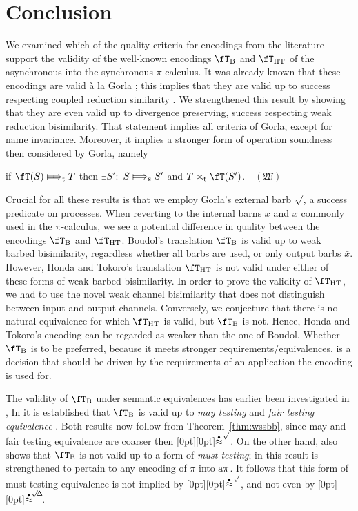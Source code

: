 \documentclass[runningheads]{llncs}
\newcommand{\thm}[1]{Theorem~\ref{thm:#1}}
\newcommand{\pT}{T}                      %
\newcommand{\fTHT}{\fT_{\textrm{HT}}}       %
\newcommand{\plat}[1]{\raisebox{0pt}[0pt][0pt]{#1}}     %
\newcommand{\trans}[1]{\fT(#1)}
\newcommand{\wbb}{\stackrel{\raisebox{-1pt}[0pt][0pt]{$\scriptscriptstyle \bullet$}}{\approx}}
\newcommand{\wssbb}{\wbb^\surd}
\newcommand{\wssbbd}{\wbb^{\!\surd\!\Delta}\!}
\newcommand{\pims}{\pi}
\newcommand{\pima}{{\rm a\pi}}
\begin{document}
\section{Conclusion}\label{sec:conclusion}

We examined which of the quality criteria for encodings from the literature support the validity
of the well-known encodings $\fT_{\rm B}$ and $\fTHT$ of the asynchronous into the synchronous $\pi$-calculus.
It was already known \cite{vG18a} that these encodings are valid \`a la Gorla \cite{Gorla10a}; this implies that
they are valid up to success respecting coupled reduction similarity \cite{EPTCS190.4}.
We strengthened this result by showing that they are even valid up to divergence preserving,
success respecting weak reduction bisimilarity. That statement implies all criteria of Gorla, except for name invariance.
Moreover, it implies a stronger form of operation soundness then considered by Gorla, namely
\begin{center}
\mbox{}\hfill
if $\trans{S} \Longmapsto_{\rm t} \pT$ then $\exists S'\!:$ $S\Longmapsto_{\rm s} S'$ and $\pT\asymp_{\rm t} \trans{S'}$.\hfill~~$(\mathfrak{W})$
\end{center}
Crucial for all these results is that we employ Gorla's external barb $\surd$, a success predicate
on processes. When reverting to the internal barns $x$ and $\bar x$ commonly used in the
$\pi$-calculus, we see a potential difference in quality between the encodings $\fT_{\rm B}$ and $\fTHT$.
Boudol's translation $\fT_{\rm B}$ is valid up to weak barbed bisimilarity, regardless whether all
barbs are used, or only output barbs $\bar x$. However, Honda and Tokoro's translation $\fTHT$
is not valid under either of these forms of weak barbed bisimilarity.
In order to prove the validity of $\fTHT$, we
had to use the novel weak channel bisimilarity that does not distinguish between input and output channels.
Conversely, we conjecture that there is no natural equivalence for which $\fTHT$ is valid, but $\fT_{\rm B}$ is not.
Hence, Honda and Tokoro's encoding can be regarded as weaker than the one of Boudol.
Whether $\fT_{\rm B}$ is to be preferred, because it meets stronger
requirements/equivalences, is a decision that should be driven by
the requirements of an application the encoding is used for.

The validity of $\fT_{\rm B}$ under semantic equivalences has earlier been investigated in \cite{CC01,CCP07},
In \cite{CC01} it is established that $\fT_{\rm B}$ is valid up to \emph{may testing}
\cite{DH84} and \emph{fair testing equivalence} \cite{BRV95,NC95}. Both results now follow from
\thm{wssbb}, since may and fair testing equivalence are coarser then \plat{$\wssbb$}.
On the other hand, \cite{CC01} also shows that $\fT_{\rm B}$ is not valid up to a
form of \emph{must testing}; in \cite{CCP07} this result is strengthened to pertain to any encoding
of $\pims$ into $\pima$.\vspace{1pt} It follows that this form of must testing equivalence is not implied by
\plat{$\wssbb$}, and not even by \plat{$\wssbbd$}.
\end{document}
